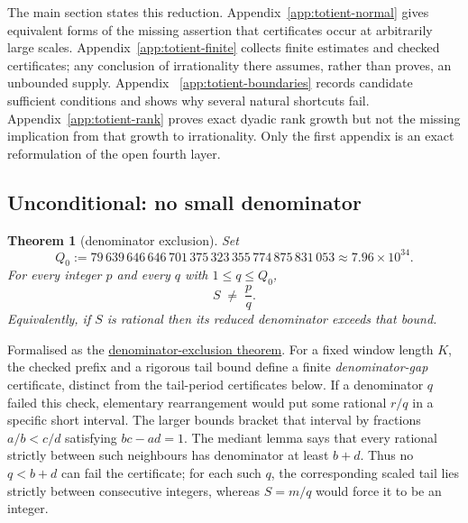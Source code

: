 \documentclass[11pt]{article}
\newcommand{\commit}{bb4e24651b37cd096d3749ef299c3317930b3a3b}
\newcommand{\repobase}{https://github.com/wcook04/plectis-lean-erdos249-257/blob/\commit}
\newcommand{\PK}{Erdos249257}
\newcommand{\lword}[4]{\href{\repobase/\PK/#1\#L#2}{#4}}
\newtheorem{theorem}{Theorem}[section]
\theoremstyle{definition}
\theoremstyle{remark}
\newcommand{\Qzero}{Q_0}
\begin{document}
The main section states this reduction.  Appendix~\ref{app:totient-normal}
gives equivalent forms of the missing assertion that certificates occur at
arbitrarily large scales.  Appendix~\ref{app:totient-finite} collects finite
estimates and checked certificates; any conclusion of irrationality there
assumes, rather than proves, an unbounded supply.  Appendix~
\ref{app:totient-boundaries} records candidate sufficient conditions and
shows why several natural shortcuts fail.  Appendix~\ref{app:totient-rank}
proves exact dyadic rank growth but not the missing implication from that
growth to irrationality.  Only the first appendix is an exact reformulation
of the open fourth layer.

\subsection{Unconditional: no small denominator}\label{sec:uncond}

\begin{theorem}[denominator exclusion]\label{res:farey}
Set
\[
\Qzero:=79\,639\,646\,646\,701\,375\,323\,355\,774\,875\,831\,053
       \approx7.96\times10^{34}.
\]
For every integer $p$ and every $q$ with $1\le q\le\Qzero$,
\[
S \;\ne\; \frac{p}{q}.
\]
Equivalently, if $S$ is rational then its reduced denominator exceeds that bound.
\end{theorem}
\noindent Formalised as the
\lword{CertificateKernel.lean}{18384}{tsum_totient_div_pow_two_ne_ratCast_of_den_le_79639646646701375323355774875831053}{denominator-exclusion theorem}.
For a fixed window length $K$, the checked prefix and a rigorous tail bound
define a finite \emph{denominator-gap} certificate, distinct from the
tail-period certificates below.  If a denominator $q$ failed this check,
elementary rearrangement would put some rational $r/q$ in a specific short
interval.  The larger bounds bracket that interval by fractions
$a/b<c/d$ satisfying $bc-ad=1$.  The mediant lemma says that every rational
strictly between such neighbours has denominator at least $b+d$.  Thus no
$q<b+d$ can fail the certificate; for each such $q$, the corresponding scaled
tail lies strictly between consecutive integers, whereas $S=m/q$ would force it
to be an integer.
\end{document}
